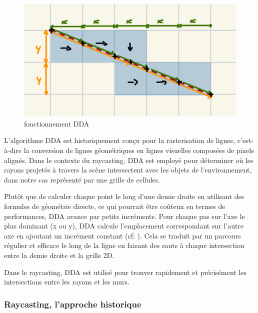 \documentclass[11pt]{article}
\begin{document}
\begin{figure}
	\begin{minipage}{\textwidth}
		\center\includegraphics[width=0.8\linewidth]{image/dda1.jpeg}
		\hspace*{-0.5cm}
		\caption{fonctionnement DDA}
		\label{fig:dda1}
	\end{minipage}
\end{figure}

L'algorithme DDA est historiquement conçu pour la rasterisation de lignes, c'est-à-dire la conversion de lignes géométriques en lignes visuelles composées de pixels 
alignés. Dans le contexte du raycasting, DDA est employé pour déterminer où les rayons projetés à travers la scène intersectent avec les objets de l'environnement, 
dans notre cas représenté par une grille de cellules.

Plutôt que de calculer chaque point le long d'une demie droite en utilisant des formules de géométrie 
directe, ce qui pourrait être coûteux en termes de performances, DDA avance par petits incréments. Pour chaque pas sur l'axe le plus 
dominant (x ou y), DDA calcule l'emplacement correspondant sur l'autre axe en ajoutant un incrément constant (cf: ). Cela se traduit par un parcours régulier et 
efficace le long de la ligne en faisant des sauts à chaque intersection entre la demie droite et la grille 2D.

Dans le raycasting, DDA est utilisé pour trouver rapidement et précisément les intersections entre les rayons et les murs. 

\subsubsection{Raycasting, l'approche historique}
\end{document}
